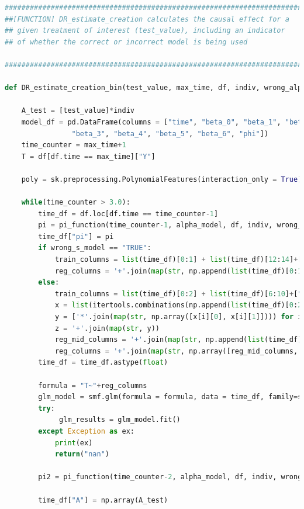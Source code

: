 \begin{lstlisting}[language=Python]
#########################################################################
##[FUNCTION] DR_estimate_creation calculates the causal effect for a 
## given treatment of interest (test_value), including an indicator 
## of whether the correct or incorrect model is being used 

#########################################################################

def DR_estimate_creation_bin(test_value, max_time, df, indiv, wrong_alpha_model, wrong_s_model, alpha_model):
    
    A_test = [test_value]*indiv 
    model_df = pd.DataFrame(columns = ["time", "beta_0", "beta_1", "beta_2", \
                "beta_3", "beta_4", "beta_5", "beta_6", "phi"])
    time_counter = max_time+1
    T = df[df.time == max_time]["Y"]
    
    poly = sk.preprocessing.PolynomialFeatures(interaction_only = True)

    while(time_counter > 3.0): 
        time_df = df.loc[df.time == time_counter-1]
        pi = pi_function(time_counter-1, alpha_model, df, indiv, wrong_alpha_model) 
        time_df["pi"] = pi
        if wrong_s_model == "TRUE":
            train_columns = list(time_df)[0:1] + list(time_df)[12:14]+["pi"]
            reg_columns = '+'.join(map(str, np.append(list(time_df)[0:1],np.append(list(time_df)[12:14], ["pi"]))))
        else: 
            train_columns = list(time_df)[0:2] + list(time_df)[6:10]+["pi"]
            x = list(itertools.combinations(np.append(list(time_df)[0:2], list(time_df)[6:10]), 2))
            y = ['*'.join(map(str, np.array([x[i][0], x[i][1]]))) for i in range(len(x))]
            z = '+'.join(map(str, y))
            reg_mid_columns = '+'.join(map(str, np.append(list(time_df)[0:2], np.append(list(time_df)[6:10],["pi"]))))
            reg_columns = '+'.join(map(str, np.array([reg_mid_columns, z])))
        time_df = time_df.astype(float)

        formula = "T~"+reg_columns 
        glm_model = smf.glm(formula = formula, data = time_df, family=sm.families.Binomial(link=sm.families.links.logit))
        try:
             glm_results = glm_model.fit()
        except Exception as ex:
            print(ex)
            return("nan")
        
        pi2 = pi_function(time_counter-2, alpha_model, df, indiv, wrong_alpha_model)
        
        time_df["A"] = np.array(A_test)
        

\end{lstlisting}
